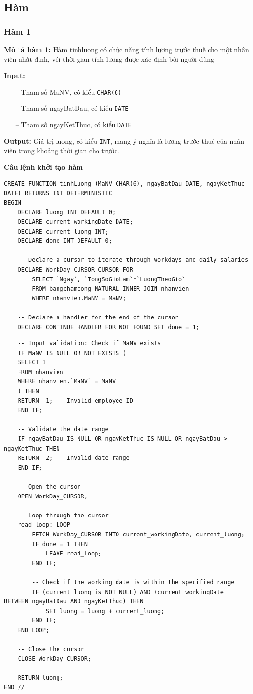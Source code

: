 \subsection{Hàm}
\subsubsection{Hàm 1}
\textbf{Mô tả hàm 1:} Hàm tinhluong có chức năng tính lương trước thuế cho một nhân viên nhất định, với thời gian tính lương được xác định bởi người dùng

\textbf{Input:} 
\begin{itemize}
    \item [--] Tham số MaNV, có kiểu \texttt{CHAR(6)} 
    \item [--] Tham số ngayBatDau, có kiểu \texttt{DATE} 
    \item [--] Tham số ngayKetThuc, có kiểu \texttt{DATE} 
\end{itemize}

\textbf{Output:} Giá trị luong, có kiểu \texttt{INT}, mang ý nghĩa là lương trước thuế của nhân viên trong khoảng thời gian cho trước.

\textbf{Câu lệnh khởi tạo hàm}
\begin{verbatim}
CREATE FUNCTION tinhLuong (MaNV CHAR(6), ngayBatDau DATE, ngayKetThuc DATE) RETURNS INT DETERMINISTIC
BEGIN
    DECLARE luong INT DEFAULT 0;
    DECLARE current_workingDate DATE;
    DECLARE current_luong INT;
    DECLARE done INT DEFAULT 0;

    -- Declare a cursor to iterate through workdays and daily salaries
    DECLARE WorkDay_CURSOR CURSOR FOR
        SELECT `Ngay`, `TongSoGioLam`*`LuongTheoGio`
        FROM bangchamcong NATURAL INNER JOIN nhanvien
        WHERE nhanvien.MaNV = MaNV;

    -- Declare a handler for the end of the cursor
    DECLARE CONTINUE HANDLER FOR NOT FOUND SET done = 1;
\end{verbatim}
\begin{verbatim}
    -- Input validation: Check if MaNV exists
    IF MaNV IS NULL OR NOT EXISTS (
    SELECT 1 
    FROM nhanvien 
    WHERE nhanvien.`MaNV` = MaNV
    ) THEN
    RETURN -1; -- Invalid employee ID
    END IF;

    -- Validate the date range
    IF ngayBatDau IS NULL OR ngayKetThuc IS NULL OR ngayBatDau > ngayKetThuc THEN
    RETURN -2; -- Invalid date range
    END IF;

    -- Open the cursor
    OPEN WorkDay_CURSOR;

    -- Loop through the cursor
    read_loop: LOOP
        FETCH WorkDay_CURSOR INTO current_workingDate, current_luong;
        IF done = 1 THEN
            LEAVE read_loop;
        END IF;

        -- Check if the working date is within the specified range
        IF (current_luong is NOT NULL) AND (current_workingDate BETWEEN ngayBatDau AND ngayKetThuc) THEN
            SET luong = luong + current_luong;
        END IF;
    END LOOP;

    -- Close the cursor
    CLOSE WorkDay_CURSOR;

    RETURN luong;
END //
\end{verbatim}


